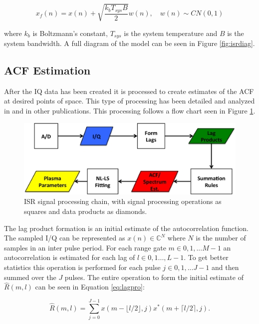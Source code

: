 \documentclass[draft,ras]{agutex}
\begin{document}
\begin{article}
\begin{equation}
\label{eq:addnoise}
x_f(n) = x(n) +\sqrt{\frac{k_bT_{sys}B}{2}} w(n), \quad w(n)\sim CN(0,1)
\end{equation}

\noindent where $k_b$ is Boltzmann's constant, $T_{sys}$ is the system temperature and $B$ is the system bandwidth.
A full diagram of the model can be seen in Figure \ref{fig:isrdiag}.


\subsection{ACF Estimation}

After the IQ data has been created it is processed to create estimates of the ACF at desired points of space. This type of processing has been detailed and analyzed in \citep{farley1969} and in other publications. This processing follows a flow chart seen in Figure \ref{fig:chain}.

\begin{figure}[!t]
\centering
\includegraphics[width=6in]{datastackchain}
\caption{ISR signal processing chain, with signal processing operations as squares and data products as diamonds.}
\label{fig:chain}
\end{figure}


The lag product formation is an initial estimate of the autocorrelation function. The sampled I/Q can be represented as $x(n) \in\mathbb{C}^N$ where $N$ is the number of samples in an inter pulse period. For each range gate $m\in 0,1,...M-1$ an autocorrelation is estimated for each lag of $l \in 0,1...,L-1$.  To get better statistics this operation is performed for each pulse $j\in 0,1,...J-1$ and then summed over the $J$ pulses. The entire operation to form the initial estimate of $\hat{R}(m,l)$ can be seen in Equation \ref{eq:lagpro}:

\begin{equation}
\label{eq:lagpro}
\hat{R}(m,l) = \displaystyle\sum\limits_{j=0}^{J-1} x(m-\lfloor l/2\rfloor,j)x^*(m+\lceil l/2 \rceil,j).
\end{equation}


\end{article}
\end{document}
